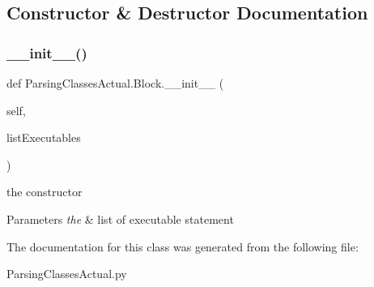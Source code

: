 \subsection{Constructor \& Destructor Documentation}
\mbox{\label{class_parsing_classes_actual_1_1_block_ac422058e3330cd4d72e14a3691037415}} 
\subsubsection{\texorpdfstring{\+\_\+\+\_\+init\+\_\+\+\_\+()}{\_\_init\_\_()}}
{\footnotesize\ttfamily def Parsing\+Classes\+Actual.\+Block.\+\_\+\+\_\+init\+\_\+\+\_\+ (\begin{DoxyParamCaption}\item[{}]{self,  }\item[{}]{list\+Executables }\end{DoxyParamCaption})}



the constructor 


\begin{DoxyParams}{Parameters}
{\em the} & list of executable statement \\
\hline
\end{DoxyParams}


The documentation for this class was generated from the following file\+:\begin{DoxyCompactItemize}
\item 
Parsing\+Classes\+Actual.\+py\end{DoxyCompactItemize}
